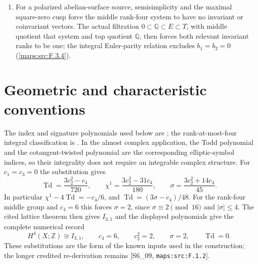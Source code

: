 \documentclass[11pt,a4paper]{article}
\theoremstyle{definition}
\providecommand{\vir}{\mathrm{vir}}
\begin{document}
\begin{enumerate}[label=\arabic*.]
  singular-value bound put a spanning tube in the unpolarized period
  domain.  The verified local-spray approximation theorem, with the
  relative extension-point argument proved here, produces a
  holomorphic transverse period section and retains any prescribed
  bounded cusp jet (\cref{maps:src:F.3.8,maps:src:F.3.10,maps:src:F.3.11}).
\item For a polarized abelian-surface source, semisimplicity and the
  maximal square-zero cusp force the middle rank-four system to have
  no invariant or coinvariant vectors.  The actual filtration
  $0\subset\mathbb Q\subset E\subset T$, with middle quotient that
  system and top quotient $\mathbb Q$, then forces both relevant
  invariant ranks to be one; the integral Euler-parity relation
  excludes $b_1=b_2=0$ (\cref{maps:src:F.3.4}).
\end{enumerate}

\providecommand{\LL}{\mathcal L}
\providecommand{\cT}{\mathcal T}
\providecommand{\HP}{\mathbb H\mathbb P}
\providecommand{\tr}{\operatorname{tr}}
\providecommand{\sgn}{\operatorname{sgn}}
\providecommand{\vir}{\mathrm{vir}}

\section{Geometric and characteristic conventions}\label{sec:V-known-inputs}
The index and signature polynomials used below are
\cite[equations (1.2)--(1.4), pp.~3--4]{ffEsoleKang}; the
rank-at-most-four integral classification is
\cite[Theorem 2.2.1, p.~61]{ffPetersSterk}.  In the almost
complex application, the Todd polynomial and the cotangent-twisted
polynomial are the corresponding elliptic-symbol indices, so their
integrality does not require an integrable complex structure.
For $c_1=c_3=0$ the substitution gives
\begin{equation}
\operatorname{Td}=\frac{3c_2^2-c_4}{720},\qquad
\chi^1=\frac{3c_2^2-31c_4}{180},\qquad
\sigma=\frac{3c_2^2+14c_4}{45}.
\label{maps:eq:F.1}
\end{equation}
In particular $\chi^1-4\operatorname{Td}=-c_4/6$, and
$\operatorname{Td}=(3\sigma-c_4)/48$.  For the rank-four middle
group and $c_4=6$ this forces $\sigma=2$, since
$\sigma\equiv2\pmod {16}$ and $|\sigma|\leq4$.
The cited lattice theorem then gives $I_{3,1}$ and the displayed
polynomials give the complete numerical record
\begin{equation}
 H^4(X;\mathbb Z)\cong I_{3,1},\qquad c_4=6,\qquad
 c_2^2=2,\qquad\sigma=2,\qquad\operatorname{Td}=0.
 \label{maps:eq:F.2}
\end{equation}
These substitutions are the form of the known inputs used in
the construction; the longer credited re-derivation remains
[S6\_09, \nolinkurl{maps:src:F.1.2}].
\end{document}
